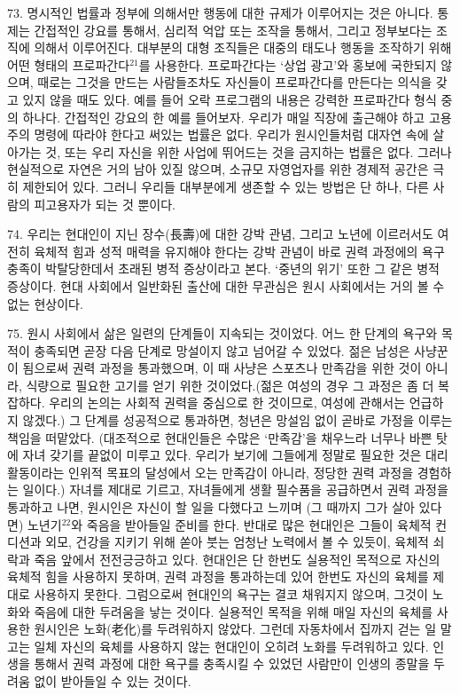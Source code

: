 \documentclass[11pt,a4paper]{article}
\begin{document}
\begin{multicols}{2}
73. 명시적인 법률과 정부에 의해서만 행동에 대한 규제가 이루어지는 것은 아니다. 통제는 간접적인  강요를 통해서, 심리적 억압 또는 조작을 통해서, 그리고 정부보다는 조직에 의해서 이루어진다. 대부분의 대형 조직들은 대중의 태도나 행동을 조작하기 위해 어떤 형태의 프로파간다\hyperlink{21}{$^{21}$}를 사용한다. 프로파간다는 `상업 광고'와 홍보에 국한되지 않으며, 때로는 그것을 만드는 사람들조차도 자신들이 프로파간다를  만든다는 의식을 갖고 있지 않을 때도 있다. 예를 들어 오락 프로그램의 내용은 강력한 프로파간다 형식 중의 하나다. 간접적인 강요의 한 예를 들어보자. 우리가 매일 직장에 출근해야 하고 고용주의 명령에  따라야 한다고 써있는 법률은 없다. 우리가 원시인들처럼 대자연 속에 살아가는 것, 또는 우리 자신을  위한 사업에 뛰어드는 것을 금지하는 법률은 없다. 그러나 현실적으로 자연은 거의 남아 있질 않으며,  소규모 자영업자를 위한 경제적 공간은 극히 제한되어 있다. 그러니 우리들 대부분에게 생존할 수 있는  방법은 단 하나, 다른 사람의 피고용자가 되는 것 뿐이다. 


74. 우리는 현대인이 지닌 장수(長壽)에 대한 강박 관념, 그리고 노년에 이르러서도 여전히 육체적 힘과  성적 매력을 유지해야 한다는 강박 관념이 바로 권력 과정에의 욕구 충족이 박탈당한데서 초래된 병적 
증상이라고 본다. `중년의 위기' 또한 그 같은 병적 증상이다. 현대 사회에서 일반화된 출산에 대한  무관심은 원시 사회에서는 거의 볼 수 없는 현상이다.  


75. 원시 사회에서 삶은 일련의 단계들이 지속되는 것이었다. 어느 한 단계의 욕구와 목적이 충족되면  곧장 다음 단계로 망설이지 않고 넘어갈 수 있었다. 젊은 남성은 사냥꾼이 됨으로써 권력 과정을  통과했으며, 이 때 사냥은 스포츠나 만족감을 위한 것이 아니라, 식량으로 필요한 고기를 얻기 위한  것이었다.(젊은 여성의 경우 그 과정은 좀 더 복잡하다. 우리의 논의는 사회적 권력을 중심으로 한  것이므로, 여성에 관해서는 언급하지 않겠다.) 그 단계를 성공적으로 통과하면, 청년은 망설임 없이  곧바로 가정을 이루는 책임을 떠맡았다. (대조적으로 현대인들은 수많은 `만족감'을 채우느라 너무나  바쁜 탓에 자녀 갖기를 끝없이 미루고 있다. 우리가 보기에 그들에게 정말로 필요한 것은 대리 활동이라는 인위적 목표의 달성에서 오는 만족감이 아니라, 정당한 권력 과정을 경험하는 일이다.) 자녀를 제대로  기르고, 자녀들에게 생활 필수품을 공급하면서 권력 과정을 통과하고 나면, 원시인은 자신이 할 일을  다했다고 느끼며 (그 때까지 그가 살아 있다면) 노년기\hyperlink{22}{$^{22}$}와 죽음을 받아들일 준비를 한다. 반대로 많은  현대인은 그들이 육체적 컨디션과 외모, 건강을 지키기 위해 쏟아 붓는 엄청난 노력에서 볼 수 있듯이,  육체적 쇠락과 죽음 앞에서 전전긍긍하고 있다. 현대인은 단 한번도 실용적인 목적으로 자신의 육체적  힘을 사용하지 못하며, 권력 과정을 통과하는데 있어 한번도 자신의 육체를 제대로 사용하지 못한다.  그럼으로써 현대인의 욕구는 결코 채워지지 않으며, 그것이 노화와 죽음에 대한 두려움을 낳는 것이다.  실용적인 목적을 위해 매일 자신의 육체를 사용한 원시인은 노화(老化)를 두려워하지 않았다. 그런데  자동차에서 집까지 걷는 일 말고는 일체 자신의 육체를 사용하지 않는 현대인이 오히려 노화를  두려워하고 있다. 인생을 통해서 권력 과정에 대한 욕구를 충족시킬 수 있었던 사람만이 인생의 종말을  두려움 없이 받아들일 수 있는 것이다. 



\end{multicols}
\end{document}
